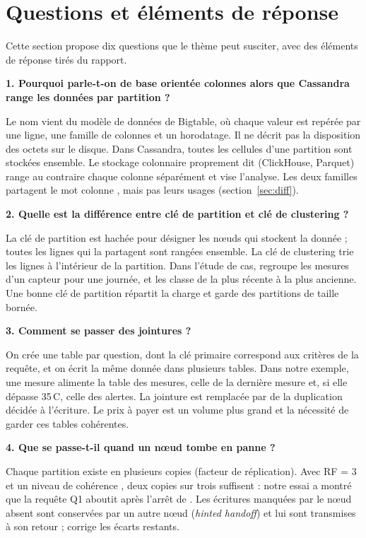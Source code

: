 \documentclass[11pt,a4paper]{article}
\newcommand{\cq}[1]{\texttt{\detokenize{#1}}}
\begin{document}
\section{Questions et éléments de réponse}
\label{sec:faq}

Cette section propose dix questions que le thème peut susciter, avec des éléments de réponse tirés du rapport.

\newcommand{\question}[1]{\par\medskip\noindent\textbf{#1}\par\smallskip}

\question{1. Pourquoi parle-t-on de base \og orientée colonnes \fg{} alors que Cassandra range les données par partition ?}
Le nom vient du modèle de données de Bigtable, où chaque valeur est repérée par une ligne, une famille de colonnes et un horodatage. Il ne décrit pas la disposition des octets sur le disque. Dans Cassandra, toutes les cellules d'une partition sont stockées ensemble. Le stockage colonnaire proprement dit (ClickHouse, Parquet) range au contraire chaque colonne séparément et vise l'analyse. Les deux familles partagent le mot \og colonne \fg{}, mais pas leurs usages (section~\ref{sec:diff}).

\question{2. Quelle est la différence entre clé de partition et clé de clustering ?}
La clé de partition est hachée pour désigner les nœuds qui stockent la donnée ; toutes les lignes qui la partagent sont rangées ensemble. La clé de clustering trie les lignes à l'intérieur de la partition. Dans l'étude de cas, \cq{(sensor_id, day)} regroupe les mesures d'un capteur pour une journée, et \cq{ts} les classe de la plus récente à la plus ancienne. Une bonne clé de partition répartit la charge et garde des partitions de taille bornée.

\question{3. Comment se passer des jointures ?}
On crée une table par question, dont la clé primaire correspond aux critères de la requête, et on écrit la même donnée dans plusieurs tables. Dans notre exemple, une mesure alimente la table des mesures, celle de la dernière mesure et, si elle dépasse 35\,\textdegree C, celle des alertes. La jointure est remplacée par de la duplication décidée à l'écriture. Le prix à payer est un volume plus grand et la nécessité de garder ces tables cohérentes.

\question{4. Que se passe-t-il quand un nœud tombe en panne ?}
Chaque partition existe en plusieurs copies (facteur de réplication). Avec RF = 3 et un niveau de cohérence \cq{QUORUM}, deux copies sur trois suffisent : notre essai a montré que la requête Q1 aboutit après l'arrêt de \cq{cass3}. Les écritures manquées par le nœud absent sont conservées par un autre nœud (\emph{hinted handoff}) et lui sont transmises à son retour ; \cq{nodetool repair} corrige les écarts restants.
\end{document}
